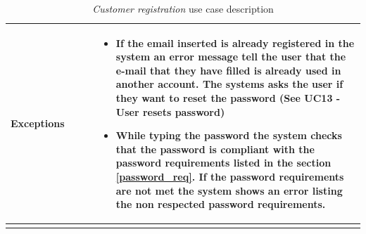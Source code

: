 \begin{longtable}{p{0.25\linewidth}p{0.75\linewidth}}
    \midrule
    \textbf{Exceptions}       &
    \begin{itemize}
        \item If the email inserted is already registered in the system an error message tell the user that the e-mail that they have filled is already used in another account. The systems asks the user if they want to reset the password (See UC13 - User resets password) %
        \item While typing the password the system checks that the password is compliant with the password requirements listed in the section \ref{password_req}. If the password requirements are not met the system shows an error listing the non respected password requirements.
    \end{itemize}                                                                                                                                     \\
    \bottomrule
    \caption{\emph{Customer registration} use case description}
\end{longtable}


